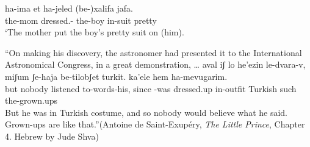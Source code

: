 \begin{exe}
\begin{xlist}
\begin{xlist}
\begin{exe}
\begin{exe}
\begin{xlist}
\begin{exe}
\begin{xlist}
\begin{exe}
\begin{xlist}
\begin{xlist}
\begin{exe}
\begin{xlist}
\begin{exe}
\begin{xlist}
\begin{exe}
\begin{xlist}
\begin{exe}
\begin{exe}
\begin{exe}
\begin{xlist}
\begin{exe}
\begin{exe}
\begin{xlist}
\begin{xlist}
\begin{exe}
\begin{xlist}
\begin{exe}
\begin{exe}
\begin{xlist}
\begin{exe}
\begin{exe}
\begin{xlist}
\begin{exe}
\begin{xlist}
\begin{exe}
\begin{xlist}
\begin{exe}
\begin{xlist}
\begin{exe}
\begin{exe}
\begin{xlist}
\begin{exe}
\begin{exe}
\begin{xlist}
\begin{xlist}
\begin{exe}
\begin{xlist}
\begin{xlist}
\begin{exe}
\begin{xlist}
\begin{exe}
\begin{xlist}
\begin{exe}
\begin{xlist}
\begin{exe}
\begin{xlist}
\begin{exe}
\begin{exe}
\begin{exe}
\begin{exe}
\begin{xlist}
\begin{exe}
\begin{exe}
\begin{xlist}
\begin{xlist}
\begin{exe}
\begin{exe}
\begin{xlist}
\begin{exe}
\begin{xlist}
\begin{exe}
\begin{xlist}
\begin{exe}
\begin{xlist}
\begin{exe}
\begin{xlist}
\begin{exe}
\begin{exe}
\begin{exe}
\begin{exe}
\begin{xlist}
 \begin{exe}
 \ex  
 \begin{xlist} 
 	\ex   
 		{ \gll ha-ima  et ha-jeled (be-)xalifa jafa.\\
 		  the-mom dressed.-  the-boy in-suit pretty\\
 		\glt `The mother put the boy's pretty suit on (him). } 
		
	
 	\ex  ``On making his discovery, the astronomer had presented it to the International Astronomical Congress, in a great demonstration, \dots 	
 		{ \gll aval iʃ lo he'ezin le-dvara-v, miʃum ʃe-haja  be-tilobʃet turkit. ka'ele hem ha-mevugarim.\\
 		  but nobody  listened to-words-his, since -was dressed.up in-outfit Turkish such  the-grown.ups\\
 		\glt But he was in Turkish costume, and so nobody would believe what he said. Grown-ups are like that.''\hfill {(Antoine de Saint-Exup\'ery, \emph{The Little Prince}, Chapter 4. Hebrew by Jude Shva\footnotemark)}} 
	
 \z
\z 


\end{xlist}
\end{exe}
\end{xlist}
\end{exe}
\end{exe}
\end{exe}
\end{exe}
\end{xlist}
\end{exe}
\end{xlist}
\end{exe}
\end{xlist}
\end{exe}
\end{xlist}
\end{exe}
\end{xlist}
\end{exe}
\end{exe}
\end{xlist}
\end{xlist}
\end{exe}
\end{exe}
\end{xlist}
\end{exe}
\end{exe}
\end{exe}
\end{exe}
\end{xlist}
\end{exe}
\end{xlist}
\end{exe}
\end{xlist}
\end{exe}
\end{xlist}
\end{exe}
\end{xlist}
\end{xlist}
\end{exe}
\end{xlist}
\end{xlist}
\end{exe}
\end{exe}
\end{xlist}
\end{exe}
\end{exe}
\end{xlist}
\end{exe}
\end{xlist}
\end{exe}
\end{xlist}
\end{exe}
\end{xlist}
\end{exe}
\end{exe}
\end{xlist}
\end{exe}
\end{exe}
\end{xlist}
\end{exe}
\end{xlist}
\end{xlist}
\end{exe}
\end{exe}
\end{xlist}
\end{exe}
\end{exe}
\end{exe}
\end{xlist}
\end{exe}
\end{xlist}
\end{exe}
\end{xlist}
\end{exe}
\end{xlist}
\end{xlist}
\end{exe}
\end{xlist}
\end{exe}
\end{xlist}
\end{exe}
\end{exe}
\end{xlist}
\end{xlist}
\end{exe}
